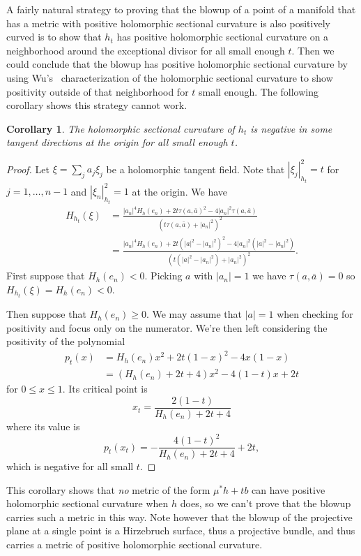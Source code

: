 \documentclass[10pt,a4paper]{amsart}
\newtheorem{coro}[theo]{Corollary}
\def\ton{a}
\def\hsc{holomorphic sectional curvature}
\begin{document}
A fairly natural strategy to proving that the blowup of a point of a manifold
that has a metric with positive \hsc{} is also positively curved is to
show that $h_t$ has positive \hsc{} on a neighborhood around the exceptional
divisor for all small enough $t$. Then we could conclude that the blowup has
positive \hsc{} by using Wu's~\cite{wu1973remark} characterization of the
\hsc{} to show positivity outside of that neighborhood for $t$ small enough.
The following corollary shows this strategy cannot work.


\begin{coro}
The holomorphic sectional curvature of $h_t$ is negative in
some tangent directions at the origin for all small enough $t$.
\end{coro}

\begin{proof}
Let $\xi = \sum_j \ton_j \xi_j$ be a holomorphic tangent field.
Note that $|\xi_j|_{h_t}^2 = t$ for $j = 1, \ldots, n-1$ and $|\xi_n|_{h_t}^2 = 1$
at the origin.
We have
\begin{align*}
H_{h_t}(\xi)
&= \frac{|\ton_n|^4 H_h(e_n)
+ 2t \tau(\ton, \bar \ton)^2
- 4 |\ton_n|^2 \tau(\ton, \bar \ton)}{(t \tau(\ton, \bar \ton) + |\ton_n|^2)^2}
\\
&= \frac{|\ton_n|^4 H_h(e_n)
+ 2t (|\ton|^2 - |\ton_n|^2)^2
- 4 |\ton_n|^2 (|\ton|^2 - |\ton_n|^2)}{(t (|\ton|^2 - |\ton_n|^2) + |\ton_n|^2)^2}.
\end{align*}
First suppose that $H_h(e_n) < 0$. Picking $\ton$ with $|\ton_n| = 1$ we have
$\tau(\ton, \bar \ton) = 0$ so $H_{h_t}(\xi) = H_h(e_n) < 0$.

Then suppose that $H_h(e_n) \geq 0$.
We may assume that $|\ton| = 1$ when checking for positivity and focus only on
the numerator. We're then left considering the positivity of the polynomial
\begin{align*}
p_t(x)
&= H_h(e_n) x^2 + 2t(1-x)^2 - 4x(1-x)
\\
&= (H_h(e_n) + 2t + 4) x^2 - 4(1 - t) x + 2t
\end{align*}
for $0 \leq x \leq 1$.
Its critical point is
$$
x_t = \frac{2(1-t)}{H_h(e_n) + 2t + 4}
$$
where its value is
$$
p_t(x_t) = -\frac{4(1-t)^2}{H_h(e_n) + 2t + 4} + 2t,
$$
which is negative for all small $t$.
\end{proof}


This corollary shows that \emph{no} metric of the form $\mu^* h + tb$ can have
positive \hsc{} when $h$ does, so we can't prove that the blowup carries such
a metric in this way.
Note however that the blowup of the projective plane at a single point
is a Hirzebruch surface, thus a projective bundle, and thus carries
a metric of positive \hsc{}.
\end{document}
